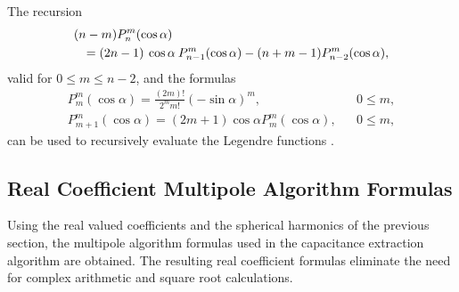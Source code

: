The recursion
\begin{eqnarray}
\lefteqn{(n-m) P_n^m(\cos\alpha)}\nonumber\\
&&=(2n-1)\: \cos\alpha\: P_{n-1}^m(\cos\alpha) - (n+m-1)P_{n-2}^m(\cos\alpha),
\label{nmrecl}
\end{eqnarray}
valid for $0\leq m\leq n-2$,
and the formulas
\begin{eqnarray}
P_m^m(\cos\alpha)=\frac{(2m)!}{2^m m!} (-\sin\alpha)^m,&&0\leq m,\label{mmlegn}\\
P_{m+1}^{m}(\cos\alpha)=(2m+1) \cos\alpha P_m^m(\cos\alpha),&&0\leq m,\label{mm1leg}
\end{eqnarray}
can be used to recursively evaluate the Legendre functions \cite{hob,mag}.

\subsection{Real Coefficient Multipole Algorithm Formulas}
\label{muform}

Using the real valued coefficients and the spherical harmonics of the previous
section, the multipole algorithm formulas used in the capacitance extraction
algorithm are obtained. The resulting real coefficient formulas eliminate the
need for complex arithmetic and square root calculations.


